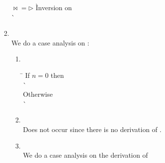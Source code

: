 \begin{enumerate}
\begin{enumerate}
    \begin{tabbing}
    $\bowtie = \rhd$
      \` Inversion on  \\
      \`  \\
    \end{tabbing}

  \item {} \ \\

    We do a case analysis on :
    \begin{enumerate}
    \item {} \ \\

      \begin{tabbing}
      \hspace{2em} \= \kill
      If $n = 0$ then \+ \\
          \`  \- \\
      Otherwise \+
         \\
          \`  \- \\
      \end{tabbing}

    \item {} \ \\

      Does not occur since there is no derivation of .

    \item {} \ \\
      We do a case analysis on the derivation of 

      \begin{enumerate}


\end{enumerate}
\end{enumerate}
\end{enumerate}
\end{enumerate}
